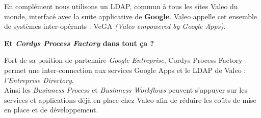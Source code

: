 En complément nous utilisons un LDAP, commun à tous les sites Valeo du monde, interfacé avec la suite applicative de \textbf{Google}. Valeo appelle cet ensemble de systèmes inter-opérants  : VeGA \textit{(Valeo empowered by Google Apps)}.

\clearpage

\textbf{Et \textit{Cordys Process Factory} dans tout ça ?}

Fort de sa position de partenaire \emph{Google Entreprise}, Cordys Process Factory permet une inter-connection aux services Google Apps  et le LDAP de Valeo : \textit{l'Entreprise Directory}.\\
Ainsi les \textit{Businness Process} et \textit{Businness Workflows} peuvent s'appuyer sur les services et applications déjà en place chez Valeo afin de réduire les coûts de mise en place et de développement.

\clearpage
